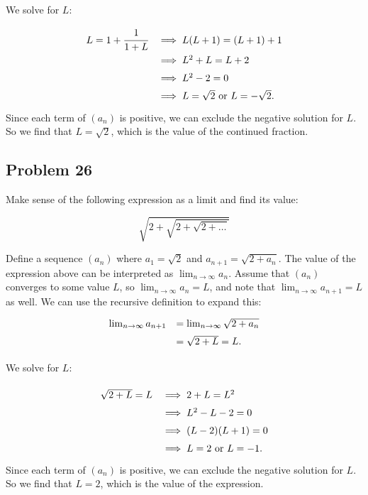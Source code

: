\documentclass[11pt]{article}
\begin{document}
We solve for $L$:

\[
\def\arraystretch{1.5}
\begin{array}{rl}
L = 1+\cfrac{1}{1+L} &\implies L(L+1) = (L+1)+1 \\
&\implies L^2+L=L+2 \\
&\implies L^2-2=0 \\
&\implies L=\sqrt{2} \textrm{ or } L=-\sqrt{2}.
\end{array}
\]
Since each term of $(a_n)$ is positive, we can exclude the negative solution
for $L$. So we find that $L=\sqrt{2}$, which is the value of the continued fraction.
\subsection*{Problem 26}
Make sense of the following expression as a limit and find its value:

\[ \sqrt{2+\sqrt{2+\sqrt{2+\ldots}}} \]

Define a sequence $(a_n)$ where $a_1=\sqrt{2}$ and
$a_{n+1} = \sqrt{2+a_n}$. The value of the expression above can
be interpreted as $\lim_{n\to\infty}a_n$. Assume that $(a_n)$ converges to some
value $L$, so $\lim_{n\to\infty}a_n=L$, and note that
$\lim_{n\to\infty}a_{n+1}=L$ as well. We can use the recursive definition to
expand this:
\[
\def\arraystretch{1.5}
\begin{array}{rl}
\lim_{n\to\infty}a_{n+1} &= \lim_{n\to\infty}\sqrt{2+a_n} \\
&= \sqrt{2+L} = L.
\end{array}
\]

We solve for $L$:

\[
\def\arraystretch{1.5}
\begin{array}{rl}
\sqrt{2+L}=L &\implies 2+L=L^2 \\
&\implies L^2-L-2=0 \\
&\implies (L-2)(L+1)=0 \\
&\implies L=2 \textrm{ or } L=-1.
\end{array}
\]
Since each term of $(a_n)$ is positive, we can exclude the negative solution
for $L$. So we find that $L=2$, which is the value of the expression.
\end{document}
